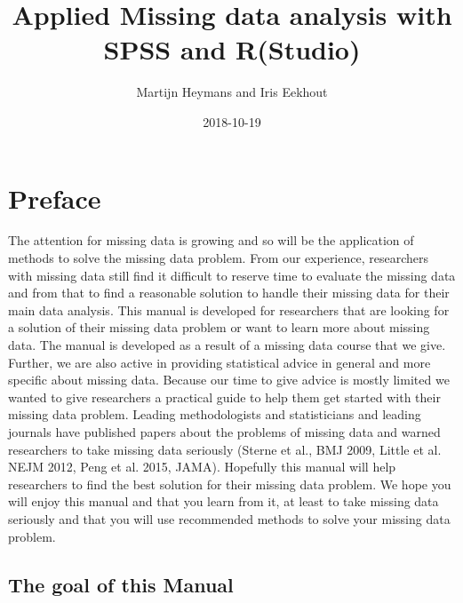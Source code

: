 \documentclass[]{book}
\title{Applied Missing data analysis with SPSS and R(Studio)}
\author{Martijn Heymans and Iris Eekhout}
\date{2018-10-19}
\theoremstyle{definition}
\theoremstyle{definition}
\theoremstyle{definition}
\theoremstyle{remark}
\begin{document}
\maketitle

{
\setcounter{tocdepth}{1}
\tableofcontents
}
\chapter*{Preface}\label{preface}

The attention for missing data is growing and so will be the application
of methods to solve the missing data problem. From our experience,
researchers with missing data still find it difficult to reserve time to
evaluate the missing data and from that to find a reasonable solution to
handle their missing data for their main data analysis. This manual is
developed for researchers that are looking for a solution of their
missing data problem or want to learn more about missing data. The
manual is developed as a result of a missing data course that we give.
Further, we are also active in providing statistical advice in general
and more specific about missing data. Because our time to give advice is
mostly limited we wanted to give researchers a practical guide to help
them get started with their missing data problem. Leading methodologists
and statisticians and leading journals have published papers about the
problems of missing data and warned researchers to take missing data
seriously (Sterne et al., BMJ 2009, Little et al. NEJM 2012, Peng et al.
2015, JAMA). Hopefully this manual will help researchers to find the
best solution for their missing data problem. We hope you will enjoy
this manual and that you learn from it, at least to take missing data
seriously and that you will use recommended methods to solve your
missing data problem.

\section{The goal of this Manual}\label{the-goal-of-this-manual}
\end{document}
